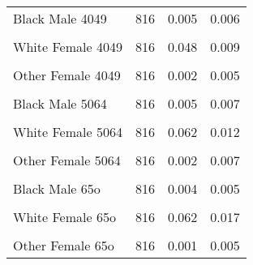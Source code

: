 \begin{table}[H]
\begin{tabular}[t]{lrrr}
Black Male 4049 & 816 & 0.005 & 0.006\\
\addlinespace
\cellcolor{gray!6}{Other Male 4049} & \cellcolor{gray!6}{816} & \cellcolor{gray!6}{0.002} & \cellcolor{gray!6}{0.005}\\
White Female 4049 & 816 & 0.048 & 0.009\\
\cellcolor{gray!6}{Black Female 4049} & \cellcolor{gray!6}{816} & \cellcolor{gray!6}{0.005} & \cellcolor{gray!6}{0.007}\\
Other Female 4049 & 816 & 0.002 & 0.005\\
\cellcolor{gray!6}{White Male 5064} & \cellcolor{gray!6}{816} & \cellcolor{gray!6}{0.058} & \cellcolor{gray!6}{0.010}\\
\addlinespace
Black Male 5064 & 816 & 0.005 & 0.007\\
\cellcolor{gray!6}{Other Male 5064} & \cellcolor{gray!6}{816} & \cellcolor{gray!6}{0.002} & \cellcolor{gray!6}{0.006}\\
White Female 5064 & 816 & 0.062 & 0.012\\
\cellcolor{gray!6}{Black Female 5064} & \cellcolor{gray!6}{816} & \cellcolor{gray!6}{0.006} & \cellcolor{gray!6}{0.009}\\
Other Female 5064 & 816 & 0.002 & 0.007\\
\addlinespace
\cellcolor{gray!6}{White Male 65o} & \cellcolor{gray!6}{816} & \cellcolor{gray!6}{0.043} & \cellcolor{gray!6}{0.011}\\
Black Male 65o & 816 & 0.004 & 0.005\\
\cellcolor{gray!6}{Other Male 65o} & \cellcolor{gray!6}{816} & \cellcolor{gray!6}{0.001} & \cellcolor{gray!6}{0.005}\\
White Female 65o & 816 & 0.062 & 0.017\\
\cellcolor{gray!6}{Black Female 65o} & \cellcolor{gray!6}{816} & \cellcolor{gray!6}{0.005} & \cellcolor{gray!6}{0.008}\\
\addlinespace
Other Female 65o & 816 & 0.001 & 0.005\\
\bottomrule
\end{tabular}
\end{table}
